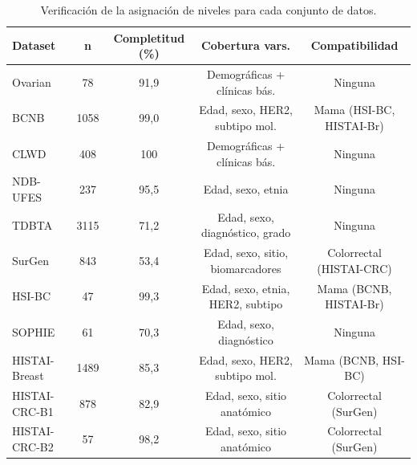 \begin{table}[htbp]
\centering
\caption{Verificación de la asignación de niveles para cada conjunto de datos.}
\label{tab:verificacion_preseleccion}
\small
\setlength{\tabcolsep}{4pt}
\begin{tabular}{lcccc}
\toprule
\textbf{Dataset} & \textbf{n} & \textbf{Completitud (\%)} & \textbf{Cobertura vars.} & \textbf{Compatibilidad} \\
\midrule
Ovarian          & 78   & 91,9  & Demográficas + clínicas bás.       & Ninguna \\
BCNB             & 1058 & 99,0  & Edad, sexo, HER2, subtipo mol.     & Mama (HSI-BC, HISTAI-Br) \\
CLWD             & 408  & 100   & Demográficas + clínicas bás.       & Ninguna \\
NDB-UFES         & 237  & 95,5  & Edad, sexo, etnia                  & Ninguna \\
TDBTA            & 3115 & 71,2  & Edad, sexo, diagnóstico, grado     & Ninguna \\
SurGen           & 843 & 53,4  & Edad, sexo, sitio, biomarcadores   & Colorrectal (HISTAI-CRC) \\
HSI-BC          & 47   & 99,3  & Edad, sexo, etnia, HER2, subtipo   & Mama (BCNB, HISTAI-Br) \\
SOPHIE           & 61   & 70,3  & Edad, sexo, diagnóstico            & Ninguna \\
HISTAI-Breast    & 1489 & 85,3  & Edad, sexo, HER2, subtipo mol.     & Mama (BCNB, HSI-BC) \\
HISTAI-CRC-B1    & 878  & 82,9  & Edad, sexo, sitio anatómico        & Colorrectal (SurGen) \\
HISTAI-CRC-B2    & 57   & 98,2  & Edad, sexo, sitio anatómico        & Colorrectal (SurGen) \\
\bottomrule
\end{tabular}
\end{table}
